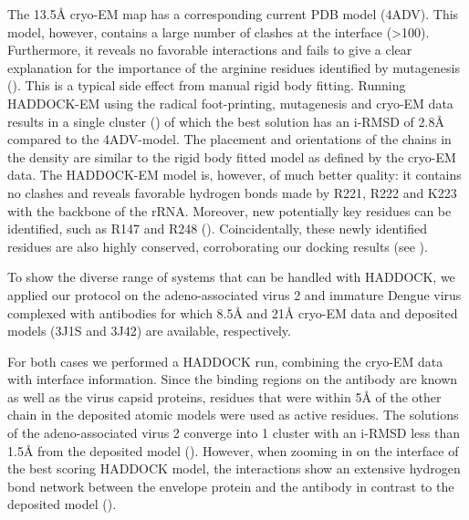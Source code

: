 The 13.5Å cryo-EM map has a corresponding current PDB model (4ADV).
This model, however, contains a large number of clashes at the interface
(>100).  Furthermore, it reveals no favorable interactions and fails to give a
clear explanation for the importance of the arginine residues identified by
mutagenesis ().  This is a typical side effect
from manual rigid body fitting.  Running HADDOCK-EM using the radical
foot-printing, mutagenesis and cryo-EM data results in a single cluster
() of which the best solution has an i-RMSD of
2.8Å compared to the 4ADV-model.  The placement and orientations of
the chains in the density are similar to the rigid body fitted model as defined
by the cryo-EM data. The HADDOCK-EM model is, however, of much better quality:
it contains no clashes and reveals favorable hydrogen bonds made by R221, R222
and K223 with the backbone of the rRNA.  Moreover, new potentially key residues
can be identified, such as R147 and R248 ().
Coincidentally, these newly identified residues are also highly conserved,
corroborating our docking results (see ).



{}

To show the diverse range of systems that can be handled with HADDOCK, we
applied our protocol on the adeno-associated virus 2 and immature Dengue virus
complexed with antibodies for which 8.5Å and 21Å cryo-EM data
and deposited models (3J1S and 3J42) are available, respectively.

For both cases we performed a HADDOCK run, combining the cryo-EM data with
interface information. Since the binding regions on the antibody are known as
well as the virus capsid proteins, residues that were within 5Å of the
other chain in the deposited atomic models were used as active residues.  The
solutions of the adeno-associated virus 2 converge into 1 cluster with an
i-RMSD less than 1.5Å from the deposited model
().  However, when zooming in on the interface
of the best scoring HADDOCK model, the interactions show an extensive hydrogen
bond network between the envelope protein and the antibody in contrast to the
deposited model ().

{}

